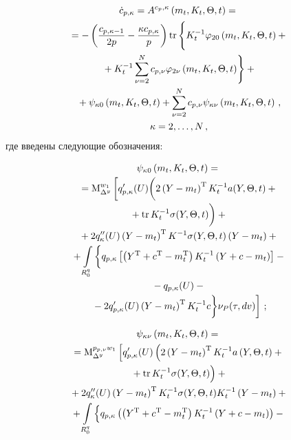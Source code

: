 \begin{multicols}{2}
\vspace*{-2pt}

\noindent
    \begin{multline}
    \dot c_{p,\kappa}=A^{c_p,\kappa} \left(m_t, K_t, \Theta, t\right)={}\\
    {}=
    -\left(\fr{c_{p,\kappa-1}}{2p} - \fr{\kappa
    c_{p,\kappa}}{p}\right) \mathrm{tr}\left\{
    \vphantom{\sum\limits_{\nu=2}^N}
    K_t^{-1}\varphi_{20}\left(m_t,K_t,\Theta,t\right)+{}\right.\\
\left.    {}+
    K_t^{-1}\sum\limits_{\nu=2}^N c_{p,\nu}\varphi_{2\nu}\left(m_t,K_t,\Theta,t\right)\right\}+{}\\
{}+\psi_{\kappa0}\left(m_t,K_t,\Theta,t\right)+
\sum\limits_{\nu=2}^N c_{p,\nu}\psi_{\kappa\nu}\left(m_t,K_t,\Theta,t\right)\,,
    \\
     \kappa=2,\ldots,N\,,\label{e3.18-sin}
    \end{multline}
где введены следующие обозначения:

\vspace*{-2pt}

\noindent
  \begin{multline}
  \psi_{\kappa 0}\left(m_t,K_t,\Theta,t\right)={}\\[-1pt]
  {}=
  \mathrm{M}_{\Delta^y}^{w_1}\left[
  q_{p,\kappa}'(U)\bigg(2\left(Y-m_t\right)^{\mathrm{T}}K_t^{-1} a(Y,\Theta,t)+{}\right.\\[-1pt]
{}+    \mathrm{tr}\,K_t^{-1}\sigma(Y,\Theta,t)\bigg)+{}\\[-1pt]
{}+ 2q_{\kappa}''(U)\left(Y-m_t\right)^{\mathrm{T}}K^{-1}\sigma(Y,\Theta,t)
\left(Y-m_t\right)+{}\\[-1pt]
{}+\int\limits_{R_0^q} \bigg\{
q_{p,\kappa}\left[
\left(Y^{\mathrm{T}}+{c}^{\mathrm{T}}-m_t^{\mathrm{T}}\right)
K_t^{-1}\left(Y+c-m_t\right)\right]-{}\\[-1pt]
{}-q_{p,\kappa}(U)-{}\\[-1pt]
\left.{}-2q_{p,\kappa}'(U)\left(Y-m_t\right)^{\mathrm{T}}
    K_t^{-1}c \bigg\}\nu_P(\tau, dv)\right]\,;\label{e3.19-sin}
    \end{multline}
    
    \vspace*{-14pt}
    
    \noindent
    \begin{multline*}
\psi_{\kappa \nu}\left(m_t,K_t,\Theta,t\right)={}\\
   {}=\mm_{\Delta^y}^{p_{p,\nu}w_1} \left[q_{p,\kappa}'(U)
   \left(2\left(Y-m_t\right)^{\mathrm{T}}K_t^{-1}a\left(Y,\Theta,t\right)+{}\right.\right.\\
\left.{}+    \hbox{\rm tr}\,K_t^{-1}\sigma(Y,\Theta,t)
\vphantom{q_{p,\kappa}'(U) \left(Y-m_t\right)^{\mathrm{T}}}
\right)+{}\\
    {}+2q_{\kappa}''(U)\left(Y-m_t\right)^{\mathrm{T}}
    K_t^{-1}\sigma(Y,\Theta,t)K_t^{-1}\left(Y-m_t\right)+{}\\
         {}+\int\limits_{R_0^q}
    \left\{ \vphantom{\left(Y-m_t\right)^{\mathrm{T}}}
    q_{p,\kappa}\left(\left(Y^{\mathrm{T}}+c^{\mathrm{T}}-m_t^{\mathrm{T}}\right)
    K_t^{-1}\left(Y+c-m_t\right)\right)-{}\right.
       \end{multline*}
       

\end{multicols}
